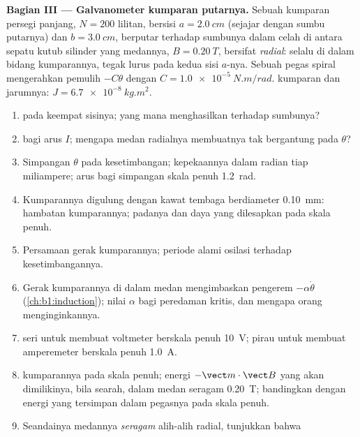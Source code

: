 \begin{problem}
\medskip
\noindent\textbf{Bagian III --- Galvanometer kumparan putarnya.}
Sebuah kumparan persegi panjang, $N = 200$ lilitan, bersisi $a = \qty{2.0}{cm}$ (sejajar
dengan sumbu putarnya) dan $b = \qty{3.0}{cm}$, berputar terhadap sumbunya dalam
celah di antara sepatu kutub silinder yang medannya, $B = \qty{0.20}{T}$,
bersifat \emph{radial}: selalu di dalam bidang kumparannya, tegak lurus pada
kedua sisi $a$-nya. Sebuah pegas spiral mengerahkan  pemulih $-C\theta$ dengan
$C = \qty{1.0e-5}{N.m/rad}$.  kumparan dan jarumnya:
$J = \qty{6.7e-8}{kg.m^2}$.
\begin{enumerate}[resume]
  \item {} pada keempat sisinya; yang mana menghasilkan 
        terhadap sumbunya?
  \item {} bagi arus $I$; mengapa medan radialnya membuatnya
        tak bergantung pada $\theta$?
  \item Simpangan $\theta$ pada kesetimbangan; kepekaannya dalam radian tiap
        miliampere; arus bagi simpangan skala penuh \qty{1.2}{rad}.
  \item Kumparannya digulung dengan kawat tembaga berdiameter \qty{0.10}{mm}:
        hambatan kumparannya;  padanya dan daya yang dilesapkan pada
        skala penuh.
  \item Persamaan gerak kumparannya; periode alami
        osilasi terhadap kesetimbangannya.
  \item Gerak kumparannya di dalam medan mengimbaskan  pengerem
        $-\alpha\dot\theta$ (\cref{ch:b1:induction}); nilai $\alpha$ bagi
        peredaman kritis, dan mengapa orang menginginkannya.
  \item {} seri untuk membuat voltmeter berskala penuh \qty{10}{V}; 
        pirau untuk membuat amperemeter berskala penuh \qty{1.0}{A}.
  \item {} kumparannya pada skala penuh; energi $-\vect m\cdot
        \vect B$ yang akan dimilikinya, bila searah, dalam medan seragam \qty{0.20}{T};
        bandingkan dengan energi yang tersimpan dalam pegasnya pada skala penuh.
  \item Seandainya medannya \emph{seragam} alih-alih radial, tunjukkan bahwa

\end{enumerate}
\end{problem}
